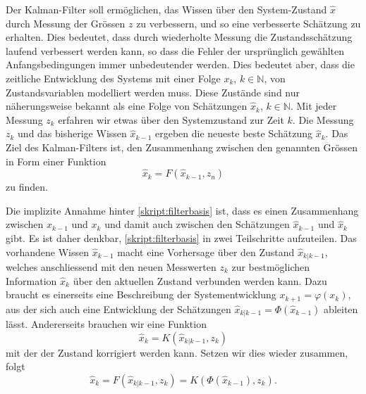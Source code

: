 Der Kalman-Filter soll ermöglichen, das Wissen über den System-Zustand
$\hat x$ durch Messung der Grössen $z$ zu verbessern, und so eine
verbesserte Schätzung zu erhalten.
Dies bedeutet, dass durch wiederholte Messung die Zustandsschätzung
laufend verbessert werden kann, so dass die Fehler der ursprünglich gewählten 
Anfangsbedingungen immer unbedeutender werden.
Dies bedeutet aber, dass die zeitliche Entwicklung des Systems mit einer Folge
$x_k$, $k\in\mathbb N$, von Zustandsvariablen modelliert werden muss.
Diese Zustände sind nur näherungsweise bekannt als eine Folge
von Schätzungen $\hat{x}_k$, $k\in\mathbb N$.
Mit jeder Messung $z_k$ erfahren wir etwas über den Systemzustand
zur Zeit $k$.
Die Messung $z_k$ und das bisherige Wissen $\hat{x}_{k-1}$ ergeben
die neueste beste Schätzung $\hat{x}_k$.
Das Ziel des Kalman-Filters ist, den Zusammenhang zwischen den
genannten Grössen in Form einer Funktion
\begin{equation}
\hat{x}_k = F(\hat{x}_{k-1},z_n)
\label{skript:filterbasis}
\end{equation}
zu finden.

Die implizite Annahme hinter \eqref{skript:filterbasis} ist,
dass es einen Zusammenhang zwischen $x_{k-1}$ und $x_k$ und damit auch
zwischen den Schätzungen $\hat{x}_{k-1}$ und $\hat{x}_k$ gibt.
Es ist daher denkbar, \eqref{skript:filterbasis} in zwei Teilschritte
aufzuteilen.
Das vorhandene Wissen $\hat{x}_{k-1}$ macht eine Vorhersage über den
Zustand $\hat{x}_{k|k-1}$, welches anschliessend mit den neuen 
Messwerten $z_k$ zur bestmöglichen Information $\hat{x}_k$ über den
aktuellen Zustand verbunden werden kann.
Dazu braucht es einerseits eine Beschreibung der Systementwicklung
$x_{k+1} = \varphi(x_k)$, aus der sich auch eine Entwicklung der
Schätzungen $\hat{x}_{k|k-1} = \Phi(\hat{x}_{k-1})$ ableiten lässt.
Andererseits brauchen wir eine Funktion
\begin{equation}
\hat{x}_k = K(\hat{x}_{k|k-1}, z_k)
\end{equation}
mit der der Zustand korrigiert werden kann.
Setzen wir dies wieder zusammen, folgt
\[
\hat{x}_k
=
F(\hat{x}_{k|k-1},z_k)
=
K(\Phi(\hat{x}_{k-1}),z_k).
\]

